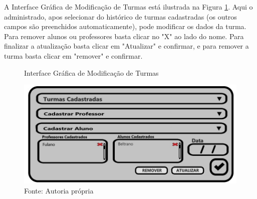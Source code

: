 \documentclass{utfpr-pg}
\begin{document}
        A Interface Gráfica de Modificação de Turmas está ilustrada na Figura \ref{fig:15}. Aqui o administrado, apos selecionar do histórico de turmas cadastradas (os outros campos são preenchidos automaticamente), pode modificar os dados da turma. Para remover alunos ou professores basta clicar no "X" ao lado do nome. Para finalizar a atualização basta clicar em "Atualizar" e confirmar, e para remover a turma basta clicar em "remover" e confirmar.
        \begin{figure}[H]
            \centering
            \captionsetup{width=0.9\textwidth}
            \caption{Interface Gráfica de Modificação de Turmas}
            \includegraphics[width=\linewidth]{fotos/15.jpg}
            \caption*{Fonte: Autoria própria}
            \label{fig:15}
        \end{figure}
        
\end{document}
